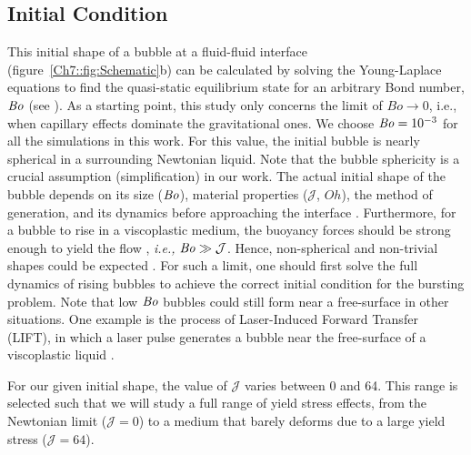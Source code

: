 \subsection{Initial Condition}\label{Sec::Initial}

This initial shape of a bubble at a fluid-fluid interface (figure~\ref{Ch7::fig:Schematic}b) can be calculated by solving the Young-Laplace equations to find the quasi-static equilibrium state for an arbitrary Bond number, $\mathit{Bo}$ (see \citep{lhuissier2012bursting, walls2015jet, deike2018dynamics,magnaudet2020particles}). As a starting point, this study only concerns the limit of $Bo \rightarrow 0$, i.e., when capillary effects dominate the gravitational ones. We choose $\mathit{Bo} = 10^{-3}$ for all the simulations in this work.  For this value, the initial bubble is nearly spherical in a surrounding Newtonian liquid.  Note that the bubble sphericity is a crucial assumption (simplification) in our work. The actual initial shape of the bubble depends on its size ($\mathit{Bo}$), material properties ($\mathcal{J}$, $Oh$), the method of generation, and its dynamics before approaching the interface \citep{dubash2004conditions, dimakopoulos2013steady, pourzahedi2022flow}. Furthermore, for a bubble to rise in a viscoplastic medium, the buoyancy forces should be strong enough to yield the flow \citep{dubash2004conditions, sikorski2009motion, balmforth2014yielding}, \textit{i.e.,} $\mathit{Bo} \gg \mathcal{J}$. Hence, non-spherical and non-trivial shapes could be expected \citep{lopez2018rising}. For such a limit, one should first solve the full dynamics of rising bubbles to achieve the correct initial condition for the bursting problem. Note that low $\mathit{Bo}$ bubbles could still form near a free-surface in other situations. One example is the process of Laser-Induced Forward Transfer (LIFT), in which a laser pulse generates a bubble near the free-surface of a viscoplastic liquid \citep{jalaal2019laser}.

For our given initial shape, the value of $\mathcal{J}$ varies between 0 and 64. This range is selected such that we will study a full range of yield stress effects, from the Newtonian limit ($\mathcal{J} = 0$) to a medium that barely deforms due to a large yield stress ($\mathcal{J} = 64$).

